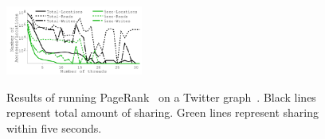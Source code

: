 {
\begin{figure}[th]
\begin{center}
\centerline{\includegraphics[width=0.4\textwidth]{Figures/g_plot_pagerank_average.pdf}}
\vspace{-0.15in}
{
Results of running PageRank~\cite{PageRank} on a Twitter graph~\cite{Kwak10-WWW}.
Black lines represent total amount of sharing.
Green lines represent sharing within five seconds.
}
\end{center}
\vspace{-0.2in}
\end{figure}
}
